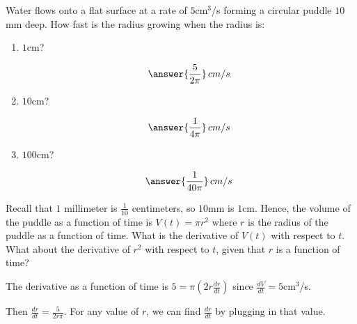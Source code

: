 \documentclass{ximera}
\author{Gregory Hartman \and Matthew Carr}
\begin{document}
\begin{exercise}



Water flows onto a flat surface at a rate of $5$cm$^3$/s forming a circular puddle $10$mm deep. How fast is the radius growing when the radius is:
\begin{enumerate}
\item $1$cm? \begin{prompt}\[\answer{\frac{5}{2\pi}}\,cm/s\]\end{prompt}
\item $10$cm? \begin{prompt}\[\answer{\frac{1}{4\pi}}\,cm/s\]\end{prompt}
\item $100$cm? \begin{prompt}\[\answer{\frac{1}{40\pi}}\,cm/s\]\end{prompt}
\end{enumerate}

\begin{hint}
Recall that $1$ millimeter is $\frac{1}{10}$ centimeters, so $10$mm is $1$cm. Hence, the volume of the puddle as a function of time is $V(t)=\pi r^2$ where $r$ is the radius of the puddle as a function of time. What is the derivative of $V(t)$ with respect to $t$. What about the derivative of $r^2$ with respect to $t$, given that $r$ is a function of time?
\end{hint}
\begin{hint}
The derivative as a function of time is $5=\pi(2r\frac{dr}{dt})$ since $\frac{dV}{dt}=5$cm$^3$/s.
\end{hint}
\begin{hint}
Then $\frac{dr}{dt}=\frac{5}{2r\pi}$. For any value of $r$, we can find $\frac{dr}{dt}$ by plugging in that value.
\end{hint}
\end{exercise}
\end{document}
